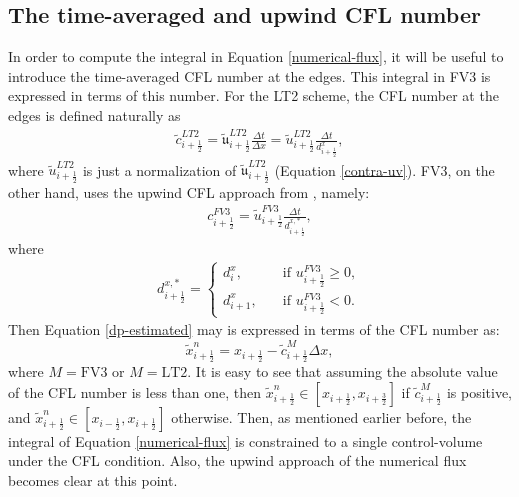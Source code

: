 \documentclass[preprint,12pt]{elsarticle}
\begin{document}
\begin{linenumbers}
\subsection{The time-averaged and upwind CFL number}
\label{timeav-cfl}
In order to compute the integral in Equation \eqref{numerical-flux}, it will be useful to introduce the time-averaged CFL number at the edges.
This integral in FV3 is expressed in terms of this number.
For the LT2 scheme, the CFL number at the edges is defined naturally as
\begin{align}
	\label{cfl_LT2}
	\tilde{c}_{i+\frac{1}{2}}^{LT2} = {\mathfrak{\tilde{u}}}_{i+\frac{1}{2}}^{LT2}\frac{\Delta t}{\Delta x}
	= {\tilde{u}}_{i+\frac{1}{2}}^{LT2}\frac{\Delta t}
	{{d^x_{i+\frac{1}{2}}}},
\end{align}
where ${\tilde{u}}_{i+\frac{1}{2}}^{LT2}$ is just a normalization of 
${\mathfrak{\tilde{u}}}_{i+\frac{1}{2}}^{LT2}$ (Equation \eqref{contra-uv}).
 FV3, on the other hand, uses the upwind CFL approach from \cite{lin:1994}, namely:
\begin{align}
	\label{cfl_fv3}
	{c}_{i+\frac{1}{2}}^{FV3}
    ={\tilde{u}}_{i+\frac{1}{2}}^{FV3}\frac{{\Delta t}}
	{{{d^{x,*}_{i+\frac{1}{2}}}}},
\end{align}
where
\begin{align}
	\label{cfl_dp1-dx}
    {{d^{x,*}_{i+\frac{1}{2}}}} = 
	\begin{cases}
		{{d^{x}_{i}}},
		\quad &\text{if }{{{u}}_{i+\frac{1}{2}}^{FV3} \ge 0},\\
		{{d^{x}_{i+1}}}, 
		\quad &\text{if }{{{u}}_{i+\frac{1}{2}}^{FV3} < 0}.
	\end{cases}
\end{align}
Then Equation \eqref{dp-estimated} may is expressed in terms of the CFL number as:
\begin{equation}
	\label{dp-estimated-cfl}
	\tilde{x}_{i+\frac{1}{2}}^n = x_{i+\frac{1}{2}} - {\tilde{c}}^{M}_{i+\frac{1}{2}}\Delta x,
\end{equation}
where $M=\text{FV3}$ or $M=\text{LT2}$. 
It is easy to see that assuming the absolute value of the CFL number is less than one, then $\tilde{x}_{i+\frac{1}{2}}^n \in [{x}_{i+\frac{1}{2}},{x}_{i+\frac{3}{2}}]$ if ${\tilde{c}}^{M}_{i+\frac{1}{2}}$ is positive, and $\tilde{x}_{i+\frac{1}{2}}^n \in [{x}_{i-\frac{1}{2}},{x}_{i+\frac{1}{2}}]$ otherwise.
Then, as mentioned earlier before, the integral of Equation \eqref{numerical-flux} is constrained to a single control-volume under the CFL condition.
Also, the upwind approach of the numerical flux becomes clear at this point.


\end{linenumbers}
\end{document}
